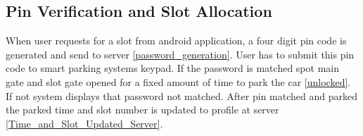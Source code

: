 \subsection{Pin Verification and Slot Allocation}
When user requests for a slot from android application, a four digit pin code is generated and send to server \ref{password_generation}. User has to submit this pin code to smart parking systems keypad. If the password is matched spot main gate and slot gate opened for a fixed amount of time to park the car \ref{unlocked}. If not system displays that password not matched. After pin matched and parked the parked time and slot number is updated to profile at server \ref{Time_and_Slot_Updated_Server}. 

\begin{figure}[H]
\centering
{}
\hspace{1cm}
\vspace{1cm}

\end{figure}
